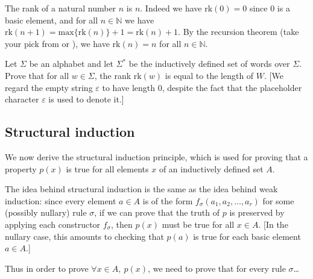 \begin{example}
The rank of a natural number $n$ is $n$. Indeed we have $\mathrm{rk}(0) = 0$ since $0$ is a basic element, and for all $n \in \mathbb{N}$ we have $\mathrm{rk}(n+1) = \mathrm{max} \{ \mathrm{rk}(n) \} + 1 = \mathrm{rk}(n) + 1$. By the recursion theorem (take your pick from  or ), we have $\mathrm{rk}(n) = n$ for all $n \in \mathbb{N}$.
\end{example}

\begin{exercise}
Let $\Sigma$ be an alphabet and let $\Sigma^*$ be the inductively defined set of words over $\Sigma$. Prove that for all $w \in \Sigma$, the rank $\mathrm{rk}(w)$ is equal to the length of $W$. [We regard the empty string $\varepsilon$ to have length $0$, despite the fact that the placeholder character $\varepsilon$ is used to denote it.]
\end{exercise}

\subsection*{Structural induction}

We now derive the structural induction principle, which is used for proving that a property $p(x)$ is true for all elements $x$ of an inductively defined set $A$.

The idea behind structural induction is the same as the idea behind weak induction: since every element $a \in A$ is of the form $f_{\sigma}(a_1,a_2,\dots,a_r)$ for some (possibly nullary) rule $\sigma$, if we can prove that the truth of $p$ is preserved by applying each constructor $f_{\sigma}$, then $p(x)$ must be true for all $x \in A$. [In the nullary case, this amounts to checking that $p(a)$ is true for each basic element $a \in A$.]

Thus in order to prove $\forall x \in A,~ p(x)$, we need to prove that for every rule $\sigma$\dots{}

\begin{center}
\end{center}

